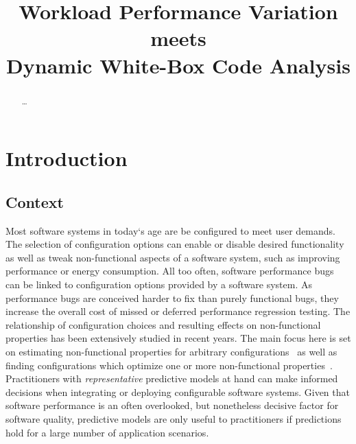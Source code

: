 \documentclass[conference]{IEEEtran}
\begin{document}
\title{Workload Performance Variation meets\\ Dynamic White-Box Code Analysis}

\author{

}
\maketitle

\begin{abstract}
\ldots
\end{abstract}


\section{Introduction}
\subsection{Context}
Most software systems in today‘s age are be configured to meet user demands. The selection of configuration options can enable or disable desired functionality as well as tweak non-functional aspects of a software system, such as improving performance or energy consumption. All too often, software performance bugs can be linked to configuration options provided by a software system\cite{han_empirical_2016}. As performance bugs are conceived harder to fix than purely functional bugs, they increase the overall cost of missed or deferred performance regression testing. The relationship of configuration choices and resulting effects on non-functional properties has been extensively studied in recent years. The main focus here is set on estimating non-functional properties for arbitrary configurations~\cite{siegmund_performance-influence_2015,haDeepPerf2019,guo__2013,guo_2018_data,sarkarCostEfficientSamplingPerformance} as well as finding configurations which optimize one or more non-functional properties~\cite{nairUsingBadLearners2017,nairFlash18,ohFindingNearoptimalConfigurations2017}. Practitioners with \emph{representative} predictive models at hand can make informed decisions when integrating or deploying configurable software systems. Given that software performance is an often overlooked, but nonetheless decisive factor for software quality, predictive models are only useful to practitioners if predictions hold for a large number of application scenarios.
\end{document}
